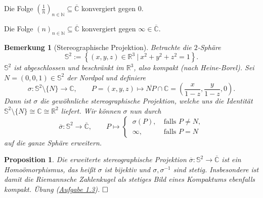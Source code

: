 \documentclass[11pt]{book}
\numberwithin{dummy}{section}
\newtheorem{proposition}[theorem]{Proposition}
\newtheorem{remark}[theorem]{Bemerkung}
\theoremstyle{nonumberbreak}
\newenvironment{defin}[1][]{\ifthenelse{\equal{#1}{}}{\definition}{\definition[#1]}\rm}{\enddefinition}
\newenvironment{pr}[1][]{\ifthenelse{\equal{#1}{}}{\proof}{\proof[#1]}\rm}{\endproof}
\newenvironment{ex}[1][]{\ifthenelse{\equal{#1}{}}{\example}{\example[#1]}\rm}{\endexample}
\newcommand{\C}{\mathbb{C}}
\newcommand{\CC}{\overline{\mathbb{C}}}
\newcommand{\la}{\longrightarrow}
\begin{document}
\begin{spacing}{1.4}
\begin{defin}
\begin{compactenum}
\end{compactenum}


\end{defin}



\begin{ex}
\begin{compactenum}
\item Die Folge $\left( \frac{1}{n}\right)_{n \in \mathbb{N}} \subseteq \CC$ konvergiert gegen $0$.
\item Die Folge $\left(n\right)_{n \in \mathbb{N}} \subseteq \CC$ konvergiert gegen $\infty \in \CC$.
\end{compactenum}
\end{ex}



\begin{remark}[Stereographische Projektion]
Betrachte die $2$-Sphäre $$\mathbb{S}^2 := \left\{(x,y,z) \in \mathbb{R}^3 \ \vert \ x^2+y^2+z^2=1 \right\}.$$ $\mathbb{S}^2$ ist abgeschlossen und beschränkt im $\mathbb{R}^3$, also kompakt (nach Heine-Borel). Sei $N=(0,0,1) \in \mathbb{S}^2$ der Nordpol und definiere
$$\sigma: \mathbb{S}^2 \setminus \{N\} \la \C, \qquad P=(x,y,z) \mapsto \overline{NP} \cap \C = \left( \frac{x}{1-z}, \frac{y}{1-z}, 0 \right).$$
Dann ist $\sigma$ die gewöhnliche stereographische Projektion, welche uns die Identität $\mathbb{S}^2 \setminus \{N\} \cong \mathbb{C} \cong \mathbb{R}^2$ liefert. Wir können $\sigma$ nun durch
$$\overline{\sigma}: \mathbb{S}^2 \la \CC, \qquad P \mapsto \begin{cases} \ \sigma(P), & \ \textrm{falls }P \neq N, \\ \ \infty, &\ \textrm{falls }P=N \end{cases}$$
auf die ganze Sphäre erweitern. 

\end{remark}

\hypertarget{propeinseinsvier}{}
\begin{proposition}
Die erweiterte stereographische Projektion $\overline{\sigma}: \mathbb{S}^2 \la \CC$ ist ein Homoömorphismus, das heißt $\sigma$ ist bijektiv und $\sigma, \sigma^{-1}$ sind stetig. Insbesondere ist damit die Riemannsche Zahlenkugel als stetiges Bild eines Kompaktums ebenfalls kompakt. 
\begin{pr}
Übung (\hyperlink{Aeinsdrei}{Aufgabe 1.3}). $\hfill \Box$
\end{pr}
\end{proposition}




\end{spacing}
\end{document}
